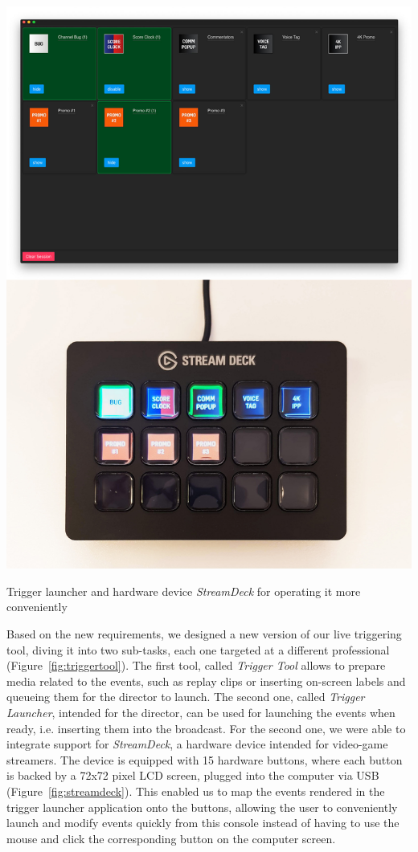 \documentclass[sigchi-a, authorversion]{acmart}
\begin{document}
\begin{marginfigure}
    \includegraphics[width=\marginparwidth-10pt]{Figures/streamdeck.jpg}
    \caption{Trigger launcher and hardware device \emph{StreamDeck} for operating it more conveniently}
    \label{fig:streamdeck}
\end{marginfigure}

Based on the new requirements, we designed a new version of our live triggering
tool, diving it into two sub-tasks, each one targeted at a different professional
(Figure~\ref{fig:triggertool}). The first tool, called \emph{Trigger Tool} allows to prepare media
related to the events, such as replay clips or inserting on-screen labels and queueing
them for the director to launch. The second one, called \emph{Trigger Launcher}, intended for the director, can
be used for launching the events when ready, i.e. inserting them into the broadcast.
For the second one, we were able to integrate support for \emph{StreamDeck}, a 
hardware device intended for video-game streamers. The device is equipped with 15
hardware buttons, where each button is backed by a 72x72 pixel LCD screen, plugged into the computer via USB
(Figure~\ref{fig:streamdeck}). This enabled us to map the events rendered in the
trigger launcher application onto the buttons, allowing the user to conveniently launch and
modify events quickly from this console instead of having to use the mouse and
click the corresponding button on the computer screen.
\end{document}
